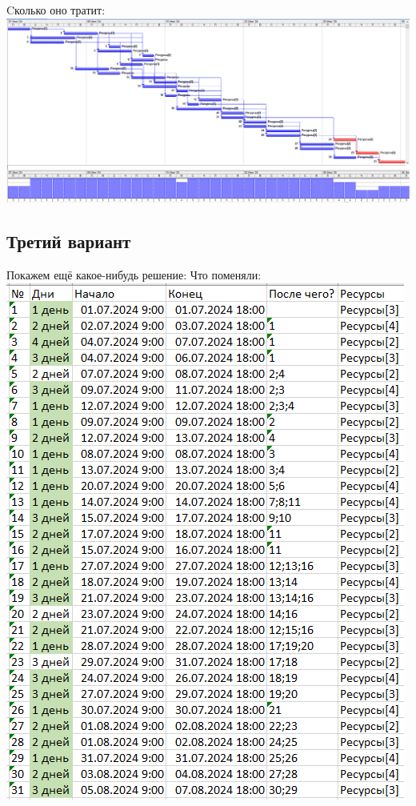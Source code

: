 \documentclass[14pt]{article}
\begin{document}
		{\LARGE Cколько оно тратит:}\\
		\includegraphics[width=\textwidth]{../img/1b2_answer.png}\\ 
	\subsection{Третий вариант}
		Покажем ещё какое-нибудь решение:
		{\LARGE Что поменяли:}\\
		\includegraphics[height=0.6\textheight]{../img/1a3_days_change.png}\\ 
\end{document}
